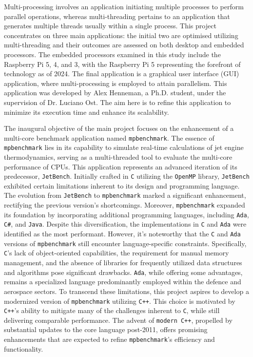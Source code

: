 \documentclass[12pt, openany]{book}
\begin{document}
Multi-processing involves an application initiating multiple processes to perform parallel operations, whereas multi-threading pertains to an application that generates multiple threads usually within a single process. This project concentrates on three main applications: the initial two are optimised utilizing multi-threading and their outcomes are assessed on both desktop and embedded processors. The embedded processors examined in this study include the Raspberry Pi 5, 4, and 3, with the Raspberry Pi 5 representing the forefront of technology as of 2024. The final application is a graphical user interface (GUI) application, where multi-processing is employed to attain parallelism. This application was developed by Alex Henneman, a Ph.D. student, under the supervision of Dr. Luciano Ost. The aim here is to refine this application to minimize its execution time and enhance its scalability. 

The inaugural objective of the main project focuses on the enhancement of a multi-core benchmark application named \texttt{mpbenchmark}. The essence of \texttt{mpbenchmark} lies in its capability to simulate real-time calculations of jet engine thermodynamics, serving as a multi-threaded tool to evaluate the multi-core performance of CPUs. This application represents an advanced iteration of its predecessor, \texttt{JetBench}. Initially crafted in \texttt{C} utilizing the \texttt{OpenMP} library, \texttt{JetBench} exhibited certain limitations inherent to its design and programming language. The evolution from \texttt{JetBench} to \texttt{mpbenchmark} marked a significant enhancement, rectifying the previous version's shortcomings. Moreover, \texttt{mpbenchmark} expanded its foundation by incorporating additional programming languages, including \texttt{Ada}, \texttt{C\#}, and \texttt{Java}. Despite this diversification, the implementations in \texttt{C} and \texttt{Ada} were identified as the most performant. However, it's noteworthy that the \texttt{C} and \texttt{Ada} versions of \texttt{mpbenchmark} still encounter language-specific constraints. Specifically, \texttt{C}'s lack of object-oriented capabilities, the requirement for manual memory management, and the absence of libraries for frequently utilized data structures and algorithms pose significant drawbacks. \texttt{Ada}, while offering some advantages, remains a specialized language predominantly employed within the defence and aerospace sectors. To transcend these limitations, this project aspires to develop a modernized version of \texttt{mpbenchmark} utilizing \texttt{C++}. This choice is motivated by \texttt{C++}'s ability to mitigate many of the challenges inherent to \texttt{C}, while still delivering comparable performance. The advent of \texttt{modern C++}, propelled by substantial updates to the core language post-2011, offers promising enhancements that are expected to refine \texttt{mpbenchmark}'s efficiency and functionality.
\end{document}
